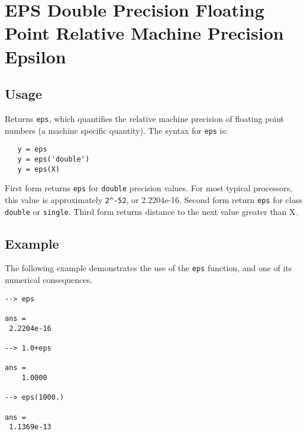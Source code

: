 \section{EPS Double Precision Floating Point Relative Machine Precision Epsilon}

\subsection{Usage}

Returns \verb|eps|, which quantifies the relative machine precision
of floating point numbers (a machine specific quantity).  The syntax
for \verb|eps| is:
\begin{verbatim}
   y = eps
   y = eps('double')
   y = eps(X)
\end{verbatim}
First form returns \verb|eps| for \verb|double| precision values. For most
typical processors, this value is approximately \verb|2^-52|, or 2.2204e-16.
Second form return \verb|eps| for class \verb|double| or \verb|single|.
Third form returns distance to the next value greater than X.
\subsection{Example}

The following example demonstrates the use of the \verb|eps| function,
and one of its numerical consequences.
\begin{verbatim}
--> eps

ans = 
 2.2204e-16 

--> 1.0+eps

ans = 
    1.0000 

--> eps(1000.)

ans = 
 1.1369e-13 
\end{verbatim}
